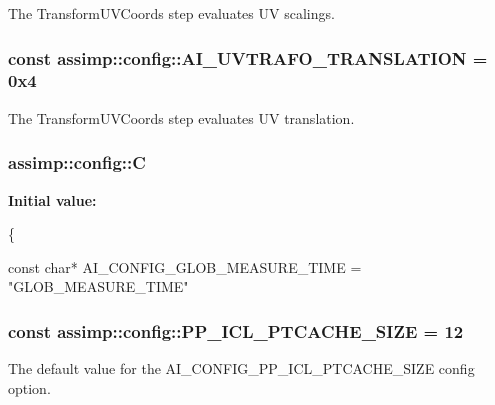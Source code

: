 The {\ttfamily Transform\+U\+V\+Coords} step evaluates U\+V scalings. \hypertarget{namespaceassimp_1_1config_a2d63f4a0199bb79cd96368310f4a68e8}{
\subsubsection[{A\+I\+\_\+\+U\+V\+T\+R\+A\+F\+O\+\_\+\+T\+R\+A\+N\+S\+L\+A\+T\+I\+O\+N}]{\setlength{\rightskip}{0pt plus 5cm}const assimp\+::config\+::\+A\+I\+\_\+\+U\+V\+T\+R\+A\+F\+O\+\_\+\+T\+R\+A\+N\+S\+L\+A\+T\+I\+O\+N = 0x4}}\label{namespaceassimp_1_1config_a2d63f4a0199bb79cd96368310f4a68e8}
The {\ttfamily Transform\+U\+V\+Coords} step evaluates U\+V translation. \hypertarget{namespaceassimp_1_1config_a20dfe02d82d69af26e2b3cbd03a5652f}{
\subsubsection[{C}]{\setlength{\rightskip}{0pt plus 5cm}assimp\+::config\+::\+C}}\label{namespaceassimp_1_1config_a20dfe02d82d69af26e2b3cbd03a5652f}
{\bfseries Initial value\+:}
\begin{DoxyCode}
\{
   

   
   \textcolor{keyword}{const} \textcolor{keywordtype}{char}* AI\_CONFIG\_GLOB\_MEASURE\_TIME = \textcolor{stringliteral}{"GLOB\_MEASURE\_TIME"}
\end{DoxyCode}
\hypertarget{namespaceassimp_1_1config_ab1622056938a6fc88aff952086419992}{
\subsubsection[{P\+P\+\_\+\+I\+C\+L\+\_\+\+P\+T\+C\+A\+C\+H\+E\+\_\+\+S\+I\+Z\+E}]{\setlength{\rightskip}{0pt plus 5cm}const assimp\+::config\+::\+P\+P\+\_\+\+I\+C\+L\+\_\+\+P\+T\+C\+A\+C\+H\+E\+\_\+\+S\+I\+Z\+E = 12}}\label{namespaceassimp_1_1config_ab1622056938a6fc88aff952086419992}
The default value for the A\+I\+\_\+\+C\+O\+N\+F\+I\+G\+\_\+\+P\+P\+\_\+\+I\+C\+L\+\_\+\+P\+T\+C\+A\+C\+H\+E\+\_\+\+S\+I\+Z\+E config option. 